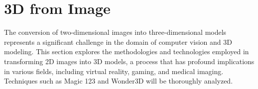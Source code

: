 \section{3D from Image}\label{3d from image}

The conversion of two-dimensional images into three-dimensional models represents a significant challenge in the domain of computer vision and 3D modeling. This section explores the methodologies and technologies employed in transforming 2D images into 3D models, a process that has profound implications in various fields, including virtual reality, gaming, and medical imaging. Techniques such as Magic 123 and Wonder3D will be thoroughly analyzed.


